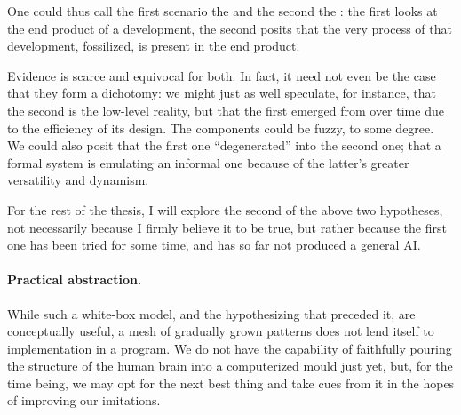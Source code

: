 One could thus call the first scenario the  and the second the : the first looks at the end product of a development, the second posits that the very process of that development, fossilized, is present in the end product.

Evidence is scarce and equivocal for both. In fact, it need not even be the case that they form a dichotomy: we might just as well speculate, for instance, that the second is the low-level reality, but that the first emerged from over time due to the efficiency of its design. The components could be fuzzy, to some degree. We could also posit that the first one ``degenerated'' into the second one; that a formal system is emulating an informal one because of the latter's greater versatility and dynamism.

For the rest of the thesis, I will explore the second of the above two hypotheses, not necessarily because I firmly believe it to be true, but rather because the first one has been tried for some time, and has so far not produced a general AI.

\paragraph{Practical abstraction.} While such a white-box model, and the hypothesizing that preceded it, are conceptually useful, a mesh of gradually grown patterns does not lend itself to implementation in a program. We do not have the capability of faithfully pouring the structure of the human brain into a computerized mould just yet, but, for the time being, we may opt for the next best thing and take cues from it in the hopes of improving our imitations.

